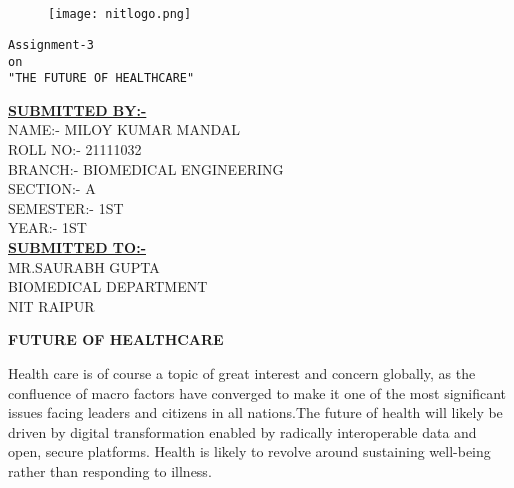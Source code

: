 \documentclass[12pt,a4paper]{report}
\begin{document}
 


\begin{center}
    \Large{}\\
\end{center}

\begin{center}
    \Large{}\\ 
\end{center}

\begin{figure}
    \centering
    \texttt{[image: nitlogo.png]}
\end{figure}

\begin{center}
   \huge{\texttt{Assignment-3\\ on\\ "THE FUTURE OF HEALTHCARE"}}
  \end{center}
 
  
\begin{center}
\textbf{\underline{SUBMITTED BY:-}}\\

NAME:- MILOY KUMAR MANDAL\\
ROLL NO:- 21111032\\
BRANCH:- BIOMEDICAL ENGINEERING\\
SECTION:- A\\
SEMESTER:- 1ST\\
YEAR:- 1ST\\

\textbf{\underline{SUBMITTED TO:-}}\\
MR.SAURABH GUPTA\\
BIOMEDICAL DEPARTMENT\\
NIT RAIPUR\\


 
\end{center} 
\clearpage

\begin{center}
  \huge{\textbf{FUTURE OF HEALTHCARE}}
\end{center}



Health care is of course a topic of great interest and concern globally, as the confluence of macro factors have converged to make it one of the most significant issues facing leaders and citizens in all nations.The future of health will likely be driven by digital transformation enabled by radically interoperable data and open, secure platforms. Health is likely to revolve around sustaining well-being rather than responding to illness.\par 
\end{document}
